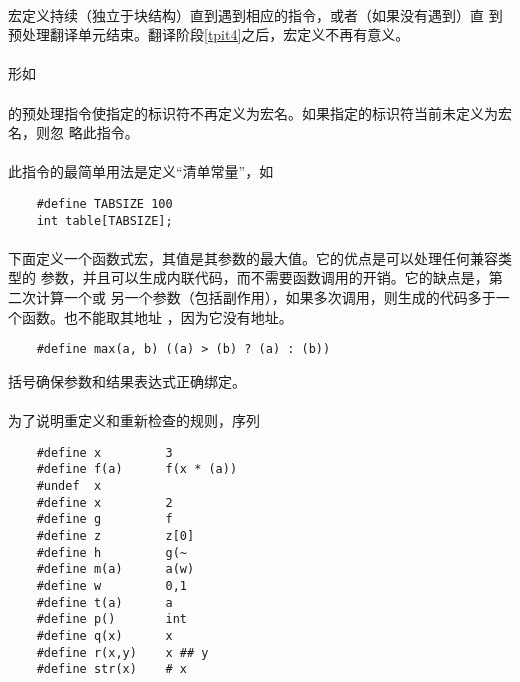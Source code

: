{                                   
\paragraph{}
宏定义持续（独立于块结构）直到遇到相应的指令，或者（如果没有遇到）直
到预处理翻译单元结束。翻译阶段\ref{tpit4}之后，宏定义不再有意义。

\paragraph{}
形如                                                                          \\
\mbox{\hspace{4em} }                     \\
的预处理指令使指定的标识符不再定义为宏名。如果指定的标识符当前未定义为宏名，则忽
略此指令。

\paragraph{}
\ex 此指令的最简单用法是定义``清单常量''，如
\begin{lstlisting}
    #define TABSIZE 100
    int table[TABSIZE];
\end{lstlisting}

\paragraph{}
\ex 下面定义一个函数式宏，其值是其参数的最大值。它的优点是可以处理任何兼容类型的
参数，并且可以生成内联代码，而不需要函数调用的开销。它的缺点是，第二次计算一个或
另一个参数（包括副作用），如果多次调用，则生成的代码多于一个函数。也不能取其地址
，因为它没有地址。
\begin{lstlisting}
    #define max(a, b) ((a) > (b) ? (a) : (b))
\end{lstlisting}
括号确保参数和结果表达式正确绑定。

\paragraph{}
\ex 为了说明重定义和重新检查的规则，序列
\begin{lstlisting}
    #define x         3
    #define f(a)      f(x * (a))
    #undef  x
    #define x         2
    #define g         f
    #define z         z[0]
    #define h         g(~
    #define m(a)      a(w)
    #define w         0,1
    #define t(a)      a
    #define p()       int
    #define q(x)      x
    #define r(x,y)    x ## y
    #define str(x)    # x


\end{lstlisting}}
